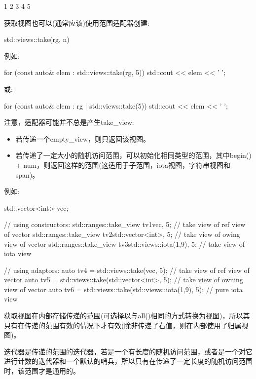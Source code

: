 \begin{shell}
1 2 3 4 5
\end{shell}


获取视图也可以(通常应该)使用范围适配器创建:

\begin{cpp}
std::views::take(rg, n)
\end{cpp}

例如:

\begin{cpp}
for (const auto& elem : std::views::take(rg, 5)) {
	std::cout << elem << ' ';
}
\end{cpp}

或:

\begin{cpp}
for (const auto& elem : rg | std::views::take(5)) {
	std::cout << elem << ' ';
}
\end{cpp}

注意，适配器可能并不总是产生take\_view:

\begin{itemize}
\item
若传递一个empty\_view，则只返回该视图。

\item
若传递了一定大小的随机访问范围，可以初始化相同类型的范围，其中begin() + num，则返回这样的范围(这适用于子范围，iota视图，字符串视图和span)。
\end{itemize}

例如:

\begin{cpp}
std::vector<int> vec;

// using constructors:
std::ranges::take_view tv1{vec, 5}; // take view of ref view of vector
std::ranges::take_view tv2{std::vector<int>{}, 5}; // take view of owing view of vector
std::ranges::take_view tv3{std::views::iota(1,9), 5}; // take view of iota view

// using adaptors:
auto tv4 = std::views::take(vec, 5); // take view of ref view of vector
auto tv5 = std::views::take(std::vector<int>{}, 5); // take view of owning view of vector
auto tv6 = std::views::take(std::views::iota(1,9), 5); // pure iota view
\end{cpp}

获取视图在内部存储传递的范围(可选择以与all()相同的方式转换为视图)，所以其只有在传递的范围有效的情况下才有效(除非传递了右值，则在内部使用了归属视图)。

迭代器是传递的范围的迭代器，若是一个有长度的随机访问范围，或者是一个对它进行计数的迭代器和一个默认的哨兵，所以只有在传递了一定长度的随机访问范围时，该范围才是通用的。

